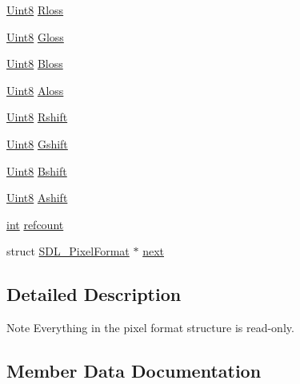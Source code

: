 \begin{DoxyCompactItemize}
\hyperlink{_s_d_l__stdinc_8h_a2944638813a090aa23e62f4da842c3e2}{Uint8} \hyperlink{struct_s_d_l___pixel_format_a9994b4ed87a2551253aebfa191db8424}{Rloss}
\item 
\hyperlink{_s_d_l__stdinc_8h_a2944638813a090aa23e62f4da842c3e2}{Uint8} \hyperlink{struct_s_d_l___pixel_format_a94469768d8436e631a13d68623ff663f}{Gloss}
\item 
\hyperlink{_s_d_l__stdinc_8h_a2944638813a090aa23e62f4da842c3e2}{Uint8} \hyperlink{struct_s_d_l___pixel_format_a337072c1bc8b41efdd2da4e95b8c2ff7}{Bloss}
\item 
\hyperlink{_s_d_l__stdinc_8h_a2944638813a090aa23e62f4da842c3e2}{Uint8} \hyperlink{struct_s_d_l___pixel_format_a660e95097874088292f1289a458efaa2}{Aloss}
\item 
\hyperlink{_s_d_l__stdinc_8h_a2944638813a090aa23e62f4da842c3e2}{Uint8} \hyperlink{struct_s_d_l___pixel_format_abfdec7b9ee2ee39db630f4022e4e0daa}{Rshift}
\item 
\hyperlink{_s_d_l__stdinc_8h_a2944638813a090aa23e62f4da842c3e2}{Uint8} \hyperlink{struct_s_d_l___pixel_format_a6045012f994c02a86bdc4a91b28d2a3c}{Gshift}
\item 
\hyperlink{_s_d_l__stdinc_8h_a2944638813a090aa23e62f4da842c3e2}{Uint8} \hyperlink{struct_s_d_l___pixel_format_a4212574b67529628d8822ed4eb109754}{Bshift}
\item 
\hyperlink{_s_d_l__stdinc_8h_a2944638813a090aa23e62f4da842c3e2}{Uint8} \hyperlink{struct_s_d_l___pixel_format_ac3c4ffa0de1f2c94040340deede3bf46}{Ashift}
\item 
\hyperlink{_s_d_l__thread_8h_a6a64f9be4433e4de6e2f2f548cf3c08e}{int} \hyperlink{struct_s_d_l___pixel_format_a23be8060443d58064a720a4e2ef31729}{refcount}
\item 
struct \hyperlink{struct_s_d_l___pixel_format}{S\+D\+L\+\_\+\+Pixel\+Format} $\ast$ \hyperlink{struct_s_d_l___pixel_format_a1953b66c817116bf81bae4873ee6bce5}{next}
\end{DoxyCompactItemize}


\subsection{Detailed Description}
\begin{DoxyNote}{Note}
Everything in the pixel format structure is read-\/only. 
\end{DoxyNote}


\subsection{Member Data Documentation}
